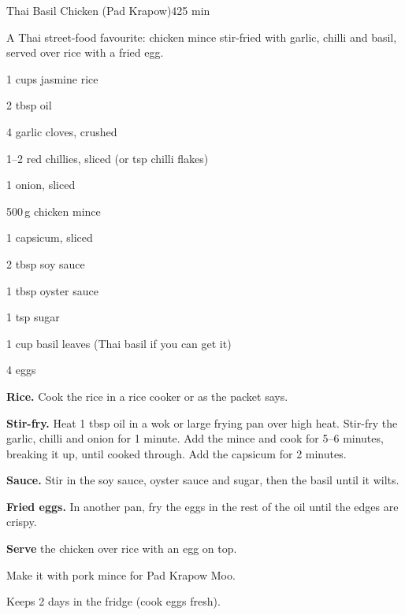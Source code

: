 \begin{recipebox}{Thai Basil Chicken (Pad Krapow)}{4}{25 min}

A Thai street-food favourite: chicken mince stir-fried with garlic, chilli and
basil, served over rice with a fried egg.

\begin{ingredients}
  \item 1 cups jasmine rice
  \item 2 tbsp oil
  \item 4 garlic cloves, crushed
  \item 1--2 red chillies, sliced (or  tsp chilli flakes)
  \item 1 onion, sliced
  \item 500\,g chicken mince
  \item 1 capsicum, sliced
  \item 2 tbsp soy sauce
  \item 1 tbsp oyster sauce
  \item 1 tsp sugar
  \item 1 cup basil leaves (Thai basil if you can get it)
  \item 4 eggs
\end{ingredients}

\begin{method}
  \item \textbf{Rice.} Cook the rice in a rice cooker or as the packet says.
  \item \textbf{Stir-fry.} Heat 1 tbsp oil in a wok or large frying pan over high
        heat. Stir-fry the garlic, chilli and onion for 1 minute. Add the mince and
        cook for 5--6 minutes, breaking it up, until cooked through. Add the
        capsicum for 2 minutes.
  \item \textbf{Sauce.} Stir in the soy sauce, oyster sauce and sugar, then the basil
        until it wilts.
  \item \textbf{Fried eggs.} In another pan, fry the eggs in the rest of the oil
        until the edges are crispy.
  \item \textbf{Serve} the chicken over rice with an egg on top.
\end{method}

\begin{notelist}
  \item Make it with pork mince for Pad Krapow Moo.
  \item Keeps 2 days in the fridge (cook eggs fresh).
\end{notelist}

\end{recipebox}
